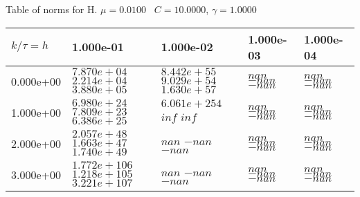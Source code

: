 \begin{center}
Table of norms for H. $\mu = 0.0100$ \, $C = 10.0000$, $\gamma = 1.0000$
  
\begin{tabular}{|p{1in}|p{1in}|p{1in}|p{1in}|p{1in}|} \hline
$k / \tau = h$ &1.000e-01 &1.000e-02 &1.000e-03 &1.000e-04 \\ \hline 
0.000e+00 & $7.870e+04$  $2.214e+04$  $3.880e+05$  & $8.442e+55$  $9.029e+54$  $1.630e+57$  & $nan$  $-nan$  $-nan$  & $nan$  $-nan$  $-nan$  \\ \hline 
1.000e+00 & $6.980e+24$  $7.809e+23$  $6.386e+25$  & $6.061e+254$  $inf$  $inf$  & $nan$  $-nan$  $-nan$  & $nan$  $-nan$  $-nan$  \\ \hline 
2.000e+00 & $2.057e+48$  $1.663e+47$  $1.740e+49$  & $nan$  $-nan$  $-nan$  & $nan$  $-nan$  $-nan$  & $nan$  $-nan$  $-nan$  \\ \hline 
3.000e+00 & $1.772e+106$  $1.218e+105$  $3.221e+107$  & $nan$  $-nan$  $-nan$  & $nan$  $-nan$  $-nan$  & $nan$  $-nan$  $-nan$  \\ \hline 

\end{tabular}\\[20pt]
\end{center}
